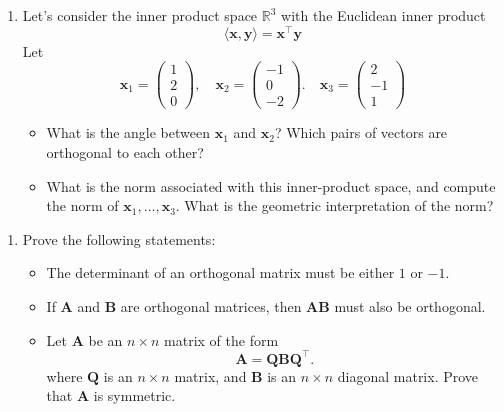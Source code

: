 \documentclass[]{book}
\providecommand{\tightlist}{%
  \setlength{\itemsep}{0pt}\setlength{\parskip}{0pt}}
\theoremstyle{definition}
\theoremstyle{definition}
\theoremstyle{definition}
\theoremstyle{remark}
\begin{document}
\begin{enumerate}
\def\labelenumi{\arabic{enumi}.}
\setcounter{enumi}{2}
\item
  Let's consider the inner product space \(\mathbb{R}^3\) with the Euclidean inner product
  \[\langle \mathbf x, \mathbf y\rangle = \mathbf x^\top \mathbf y\]
  Let
  \[\mathbf x_1 = \left(\begin{array}{c}1\\2\\0\end{array}\right), \quad \mathbf x_2 = \left(\begin{array}{c}-1\\0\\-2\end{array}\right). \quad \mathbf x_3 = \left(\begin{array}{c}2\\-1\\1\end{array}\right)
    \]

  \begin{itemize}
  \tightlist
  \item
    What is the angle between \(\mathbf x_1\) and \(\mathbf x_2\)? Which pairs of vectors are orthogonal to each other?
  \item
    What is the norm associated with this inner-product space, and compute the norm of \(\mathbf x_1, \ldots, \mathbf x_3\). What is the geometric interpretation of the norm?
  \end{itemize}
\end{enumerate}

\begin{enumerate}
\def\labelenumi{\arabic{enumi}.}
\setcounter{enumi}{3}
\tightlist
\item
  Prove the following statements:

  \begin{itemize}
  \tightlist
  \item
    The determinant of an orthogonal matrix must be either \(1\) or \(-1\).
  \item
    If \(\mathbf A\) and \(\mathbf B\) are orthogonal matrices, then \(\mathbf A\mathbf B\) must also be orthogonal.
  \item
    Let \(\mathbf A\) be an \(n\times n\) matrix of the form
    \[\mathbf A= \mathbf Q\mathbf B\mathbf Q^\top.\]
    where \(\mathbf Q\) is an \(n\times n\) matrix, and \(\mathbf B\) is an \(n\times n\) diagonal matrix. Prove that \(\mathbf A\) is symmetric.
  \end{itemize}
\end{enumerate}
\end{document}
